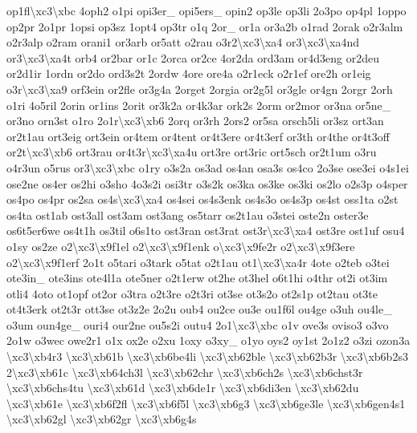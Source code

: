 {op1fl\textbackslash{}xc3\textbackslash{}xbc 4oph2 o1pi opi3er\-\_\- opi5ers\-\_\- opin2 op3le op3li 2o3po op4pl 1oppo op2pr 2o1pr 1opsi op3sz 1opt4 op3tr o1q 2or\-\_\- or1a or3a2b o1rad 2orak o2r3alm o2r3alp o2ram orani1 or3arb or5att o2rau o3r2\textbackslash{}xc3\textbackslash{}xa4 or3\textbackslash{}xc3\textbackslash{}xa4nd or3\textbackslash{}xc3\textbackslash{}xa4t orb4 or2bar or1c 2orca or2ce 4or2da ord3am or4d3eng or2deu or2d1ir 1ordn or2do ord3s2t 2ordw 4ore ore4a o2r1eck o2r1ef ore2h or1eig o3r\textbackslash{}xc3\textbackslash{}xa9 orf3ein or2fle or3g4a 2orget 2orgia or2g5l or3gle or4gn 2orgr 2orh o1ri 4o5ril 2orin or1ins 2orit or3k2a or4k3ar ork2s 2orm or2mor or3na or5ne\-\_\- or3no orn3st o1ro 2o1r\textbackslash{}xc3\textbackslash{}xb6 2orq or3rh 2ors2 or5sa orsch5li or3sz ort3an or2t1au ort3eig ort3ein or4tem or4tent or4t3ere or4t3erf or3th or4the or4t3off or2t\textbackslash{}xc3\textbackslash{}xb6 ort3rau or4t3r\textbackslash{}xc3\textbackslash{}xa4u ort3re ort3ric ort5sch or2t1um o3ru o4r3un o5rus or3\textbackslash{}xc3\textbackslash{}xbc o1ry o3s2a os3ad os4an osa3s os4co 2o3se ose3ei o4s1ei ose2ne os4er os2hi o3sho 4o3s2i osi3tr o3s2k os3ka os3ke os3ki os2lo o2s3p o4sper os4po os4pr os2sa os4s\textbackslash{}xc3\textbackslash{}xa4 os4sei os4s3enk os4s3o os4s3p os4st oss1ta o2st os4ta ost1ab ost3all ost3am ost3ang os5tarr os2t1au o3stei oste2n oster3e os6t5er6we os4t1h os3til o6s1to ost3ran ost3rat ost3r\textbackslash{}xc3\textbackslash{}xa4 ost3re ost1uf osu4 o1sy os2ze o2\textbackslash{}xc3\textbackslash{}x9f1el o2\textbackslash{}xc3\textbackslash{}x9f1enk o\textbackslash{}xc3\textbackslash{}x9fe2r o2\textbackslash{}xc3\textbackslash{}x9f3ere o2\textbackslash{}xc3\textbackslash{}x9f1erf 2o1t o5tari o3tark o5tat o2t1au ot1\textbackslash{}xc3\textbackslash{}xa4r 4ote o2teb o3tei ote3in\-\_\- ote3ins ote4l1a ote5ner o2t1erw ot2he ot3hel o6t1hi o4thr ot2i ot3im otli4 4oto ot1opf ot2or o3tra o2t3re o2t3ri ot3se ot3s2o ot2s1p ot2tau ot3te ot4t3erk ot2t3r ott3se ot3z2e 2o2u oub4 ou2ce ou3e ou1f6l ou4ge o3uh ou4le\-\_\- o3um oun4ge\-\_\- ouri4 our2ne ou5s2i outu4 2o1\textbackslash{}xc3\textbackslash{}xbc o1v ove3s oviso3 o3vo 2o1w o3wec owe2r1 o1x ox2e o2xu 1oxy o3xy\-\_\- o1yo oys2 oy1st 2o1z2 o3zi ozon3a \textbackslash{}xc3\textbackslash{}xb4r3 \textbackslash{}xc3\textbackslash{}xb61b \textbackslash{}xc3\textbackslash{}xb6be4li \textbackslash{}xc3\textbackslash{}xb62ble \textbackslash{}xc3\textbackslash{}xb62b3r \textbackslash{}xc3\textbackslash{}xb6b2s3 2\textbackslash{}xc3\textbackslash{}xb61c \textbackslash{}xc3\textbackslash{}xb64ch3l \textbackslash{}xc3\textbackslash{}xb62chr \textbackslash{}xc3\textbackslash{}xb6ch2s \textbackslash{}xc3\textbackslash{}xb6chst3r \textbackslash{}xc3\textbackslash{}xb6chs4tu \textbackslash{}xc3\textbackslash{}xb61d \textbackslash{}xc3\textbackslash{}xb6de1r \textbackslash{}xc3\textbackslash{}xb6di3en \textbackslash{}xc3\textbackslash{}xb62du \textbackslash{}xc3\textbackslash{}xb61e \textbackslash{}xc3\textbackslash{}xb6f2fl \textbackslash{}xc3\textbackslash{}xb6f5l \textbackslash{}xc3\textbackslash{}xb6g3 \textbackslash{}xc3\textbackslash{}xb6ge3le \textbackslash{}xc3\textbackslash{}xb6gen4s1 \textbackslash{}xc3\textbackslash{}xb62gl \textbackslash{}xc3\textbackslash{}xb62gr \textbackslash{}xc3\textbackslash{}xb6g4s }
